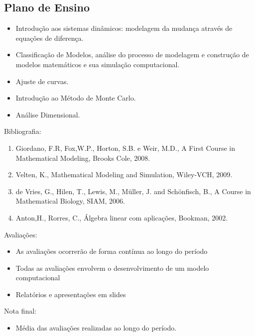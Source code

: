 \documentclass[]{beamer}
\begin{document}
\subsection{Plano de Ensino}
\begin{frame}{\insertsection}{\insertsubsection}
\begin{itemize}
\item Introdução aos sistemas dinâmicos: modelagem da mudança através de equações de diferença.
\item Classificação de Modelos, análise do processo de modelagem e construção de modelos matemáticos e sua simulação computacional.
\item Ajuste de curvas.
\item Introdução ao Método de Monte Carlo.
\item Análise Dimensional.
\end{itemize}
\end{frame}
\begin{frame}{\insertsection}{\insertsubsection}
Bibliografia:

\begin{enumerate}
\item 
Giordano, F.R, Fox,W.P., Horton, S.B. e Weir, M.D., A First Course in Mathematical Modeling, Brooks Cole, 2008.
\item
Velten, K., Mathematical Modeling and Simulation, Wiley-VCH, 2009.
\item
de Vries, G., Hilen, T., Lewis, M., Müller, J. and Schönfisch, B., A Course in Mathematical Biology, SIAM, 2006.
\item
Anton,H., Rorres, C., Álgebra linear com aplicações, Bookman, 2002.
\end{enumerate}
\end{frame}
\begin{frame}{\insertsection}{\insertsubsection}
Avaliações:

\begin{itemize}
 \item As avaliações ocorrerão de forma contínua ao longo do período
 \item Todas as avaliações envolvem o desenvolvimento de um modelo computacional
 \item Relatórios e apresentações em slides
\end{itemize}

Nota final:
\begin{itemize}
 \item Média das avaliações realizadas ao longo do período.
\end{itemize}

\end{frame}
\end{document}
